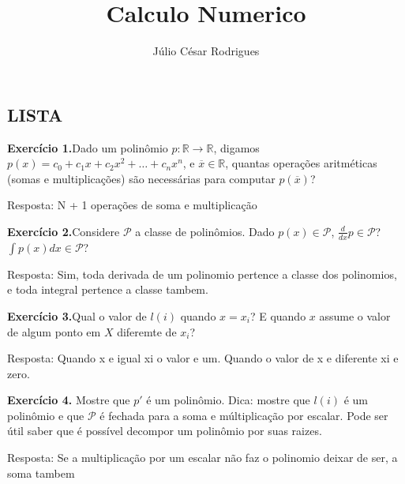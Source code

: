\documentclass{article}
\title{Calculo Numerico}
\author{Júlio César Rodrigues}
\begin{document}
\maketitle
\begin{flushleft}
\section{LISTA}
\large{

\begin{exercicio}
\textbf{Exercício 1.}Dado um polinômio $p : \mathbb{R} \to \mathbb{R}$, digamos
  $p(x) = c_0 + c_1x + c_2x^2 + \dots + c_nx^n$, e
  $\overline{x} \in \mathbb{R}$, quantas operações aritméticas (somas
  e multiplicações) são necessárias para computar $p(\overline{x})$?
\end{exercicio}

Resposta: N + 1 operações de soma e multiplicação\newline

\begin{exercicio}
\textbf{Exercício 2.}Considere $\mathcal{P}$ a classe de polinômios. Dado
  $p(x) \in \mathcal{P}$, $\frac{d}{dx} p \in \mathcal{P}$?
  $\int p(x)dx \in \mathcal{P}$?
\end{exercicio}
Resposta: Sim, toda derivada de um polinomio pertence a classe dos polinomios, e toda integral pertence a classe tambem.\newline

\begin{exercicio}
   \textbf{Exercício 3.}Qual o valor de $l(i)$ quando $x = x_i$? E quando $x$ assume o valor
  de algum ponto em $X$ diferemte de $x_i$?

\end{exercicio}
Resposta: Quando x e igual xi o valor e um. Quando o valor de x e diferente xi e zero.\newline

\begin{exercicio}
 \textbf{Exercício 4.} Mostre que $p'$ é um polinômio. Dica: mostre que $l(i)$ é um
  polinômio e que $\mathcal{P}$ é fechada para a soma e múltiplicação
  por escalar. Pode ser útil saber que é possível decompor um
  polinômio por suas raizes.\\
\end{exercicio}
Resposta: Se a multiplicação por um escalar não faz o polinomio deixar de ser, a soma tambem\newline

}
\end{flushleft}
\end{document}
